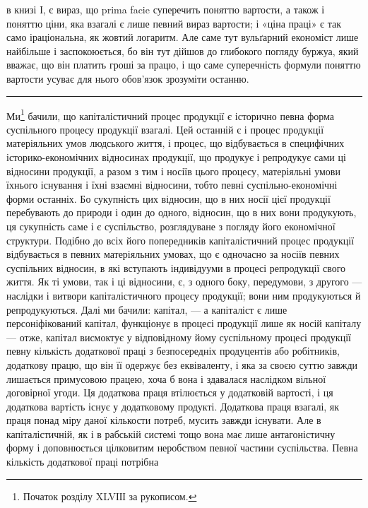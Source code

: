 \parcont{}  %
в книзі І, є вираз, що prima facie суперечить поняттю вартости, а також
і поняттю ціни, яка взагалі є лише певний вираз вартости; і «ціна праці»
є так само іраціональна, як жовтий логаритм. Але саме тут вульґарний
економіст лише найбільше і заспокоюється, бо він тут дійшов до глибокого погляду
буржуа, який вважає, що він платить гроші за працю, і що саме суперечність
формули поняттю вартости усуває для нього обов’язок зрозуміти останню.

\pfbreak

Ми\footnote{
Початок розділу XLVІІІ за рукописом.
} бачили, що капіталістичний процес продукції є історично певна
форма суспільного процесу продукції взагалі. Цей останній є і процес продукції
матеріяльних умов людського життя, і процес, що відбувається в специфічних
історико-економічних відносинах продукції, що продукує і репродукує сами
ці відносини продукції, а разом з тим і носіїв цього процесу, матеріяльні умови їхнього
існування і їхні взаємні відносини, тобто певні суспільно-економічні
форми останніх. Бо сукупність цих відносин, що в них носії цієї продукції перебувають
до природи і один до одного, відносин, що в них вони продукують, ця сукупність
саме і є суспільство, розглядуване з погляду його економічної структури.
Подібно до всіх його попередників капіталістичний процес продукції відбувається
в певних матеріяльних умовах, що є одночасно за носіїв певних суспільних
відносин, в які вступають індивідууми в процесі репродукції свого життя. Як
ті умови, так і ці відносини, є, з одного боку, передумови, з другого — наслідки
і витвори капіталістичного процесу продукції; вони ним продукуються й репродукуються.
Далі ми бачили: капітал, — а капіталіст є лише персоніфікований
капітал, функціонує в процесі продукції лише як носій капіталу — отже, капітал
висмоктує у відповідному йому суспільному процесі продукції певну кількість
додаткової праці з безпосередніх продуцентів або робітників, додаткову працю,
що він її одержує без еквіваленту, і яка за своєю суттю завжди лишається
примусовою працею, хоча б вона і здавалася наслідком вільної договірної угоди.
Ця додаткова праця втілюється у додатковій вартості, і ця додаткова вартість
існує у додатковому продукті. Додаткова праця взагалі, як праця понад міру
даної кількости потреб, мусить завжди існувати. Але в капіталістичній, як і в рабській
системі тощо вона має лише антагоністичну форму і доповнюється цілковитим
неробством певної частини суспільства. Певна кількість додаткової праці потрібна
